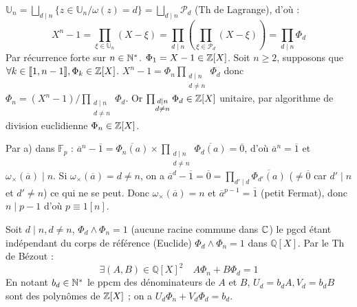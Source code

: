 \begin{solution}
$\mathbb{U}_n = \bigsqcup_{d \mid n} \{z \in \mathbb{U}_n / \omega(z) = d\} = \bigsqcup_{d \mid n} \mathcal{P}_d$ (Th de Lagrange), d'où :
\[ X^n - 1 = \prod_{\xi \in \mathbb{U}_n} (X - \xi) = \prod_{d \mid n} \left(\prod_{\xi \in \mathcal{P}_d} (X - \xi)\right) = \prod_{d \mid n} \Phi_d \]
Par récurrence forte sur $n \in \mathbb N^*$. $\Phi_1 = X - 1 \in \mathbb Z[X]$.
Soit $n \geq 2$, supposons que $\forall k \in \llbracket 1, n-1 \rrbracket, \Phi_k \in \mathbb Z[X]$.
$X^n - 1 = \Phi_n \prod_{\substack{d \mid n \\ d \neq n}} \Phi_d$ donc $\Phi_n = (X^n - 1) \Big/ \prod_{\substack{d \mid n \\ d \neq n}} \Phi_d$. Or $\prod_{\substack{d \mid n \\ d \neq n}} \Phi_d \in \mathbb Z[X]$ unitaire, par algorithme de division euclidienne $\Phi_n \in \mathbb Z[X]$.

Par a) dans $\mathbb{F}_p$ : $\overline{a}^n - \overline{1} = \overline{\Phi_n(a)} \times \prod_{\substack{d \mid n \\ d \neq n}} \overline{\Phi_d(a)} = \overline{0}$, d'où $\overline{a}^n = \overline{1}$ et $\omega_\times(\overline{a}) \mid n$.
Si $\omega_\times(\overline{a}) = d \neq n$, on a $\overline{a}^d - \overline{1} = \overline{0} = \prod_{d' \mid d} \overline{\Phi_{d'}(a)}$ ($\neq \overline{0}$ car $d' \mid n$ et $d' \neq n$) ce qui ne se peut.
Donc $\omega_\times(\overline{a}) = n$ et $\overline{a}^{p-1} = \overline{1}$ (petit Fermat), donc $n \mid p-1$ d'où $\boxed{p \equiv 1 [n]}$.

Soit $d \mid n, d \neq n$, $\Phi_d \wedge \Phi_n = 1$ (aucune racine commune dans $\mathbb C$) le pgcd étant indépendant du corps de référence (Euclide) $\Phi_d \wedge \Phi_n = 1$ dans $\mathbb{Q}[X]$. Par le Th de Bézout :
\[ \exists (A,B) \in \mathbb{Q}[X]^2 \quad A \Phi_n + B \Phi_d = 1 \]
En notant $b_d \in \mathbb N^*$ le ppcm des dénominateurs de $A$ et $B$, $U_d = b_d A, V_d = b_d B$ sont des polynômes de $\mathbb Z[X]$ ; on a $U_d \Phi_n + V_d \Phi_d = b_d$.


\end{solution}
